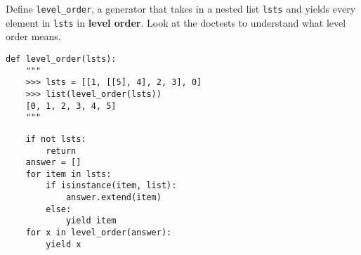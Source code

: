 \begin{blocksection}
\question Define \lstinline$level_order$, a generator that takes in a nested list \lstinline$lsts$ and yields every element in \lstinline$lsts$ in \textbf{level order}. Look at the doctests to understand what level order means. 

\begin{lstlisting}
def level_order(lsts):
    """
    >>> lsts = [[1, [[5], 4], 2, 3], 0]
    >>> list(level_order(lsts))
    [0, 1, 2, 3, 4, 5]
    """
\end{lstlisting}

\begin{solution}[1.5in]
\begin{lstlisting}
    if not lsts:
        return
    answer = []
    for item in lsts:
        if isinstance(item, list):
            answer.extend(item)
        else:
            yield item
    for x in level_order(answer):
        yield x
\end{lstlisting}
\end{solution}
\end{blocksection}
